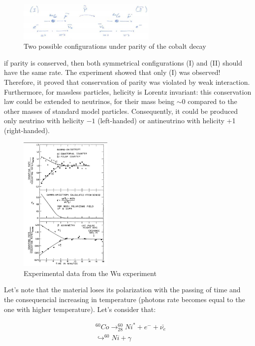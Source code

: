 \begin{figure}[!h]
    \centering
    \includegraphics[width=0.6\textwidth]{Figures/FNSN31_3.JPG}
    \caption{Two possible configurations under parity of the cobalt decay }
    \label{fig:Wu2}
\end{figure} 

if parity is conserved, then both symmetrical configurations (I) and (II) should have the same rate. The experiment showed that only (I) was observed! Therefore, it proved that conservation of parity was violated by weak interaction.
Furthermore, for massless particles, helicity is Lorentz invariant: this conservation law could be extended to neutrinos, for their mass being $\sim 0$ compared to the other masses of standard model particles. Consequently, it could be produced only neutrino with helicity $-1$ (left-handed) or antineutrino with helicity +1 (right-handed).

\begin{figure}[!h]
    \centering
    \includegraphics[width=0.4\textwidth]{Figures/FNSN31_4.JPG}
    \caption{Experimental data from the Wu experiment}
     \label{fig:Wu3}
\end{figure} 

Let's note that the material loses its polarization with the passing of time and the consequencial increasing in temperature (photons rate becomes equal to the one with higher temperature).
Let's consider that:

\begin{eqnarray*}
& ^{60}Co \rightarrow _{28}^{60}Ni^* + e^- +\bar{\nu_e}\\
&\hookrightarrow ^{60}Ni + \gamma
\end{eqnarray*}

